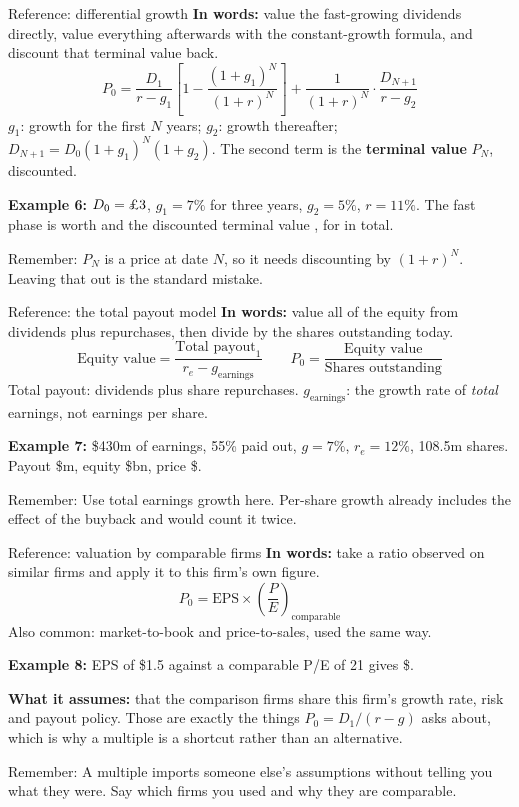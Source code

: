 \documentclass[10pt,aspectratio=169]{beamer}
\newcommand{\remember}[1]{\par\smallskip\alert{Remember:} #1}
\renewcommand{\pounds}{\ifmmode\text{\textsterling}\else\textsterling\fi}
\begin{document}
\begin{frame}[label=differential]{Reference: differential growth}
\textbf{In words:} value the fast-growing dividends directly, value everything afterwards with the constant-growth formula, and discount that terminal value back.
\[
P_0=\frac{D_1}{r-g_1}\left[1-\frac{(1+g_1)^N}{(1+r)^N}\right]+\frac{1}{(1+r)^N}\cdot\frac{D_{N+1}}{r-g_2}
\]
$g_1$: growth for the first $N$ years; $g_2$: growth thereafter; $D_{N+1}=D_0(1+g_1)^N(1+g_2)$. The second term is the \textbf{terminal value} $P_N$, discounted.
\par\smallskip
\textbf{Example 6:} $D_0=\pounds3$, $g_1=7\%$ for three years, $g_2=5\%$, $r=11\%$. The fast phase is worth \pounds\LDiffGrowthStage{} and the discounted terminal value \pounds\LDiffTerminal, for \pounds\LDiffTotal{} in total.
\remember{$P_N$ is a price at date $N$, so it needs discounting by $(1+r)^N$. Leaving that out is the standard mistake.}
\end{frame}

\begin{frame}[label=payout]{Reference: the total payout model}
\textbf{In words:} value all of the equity from dividends plus repurchases, then divide by the shares outstanding today.
\[
\text{Equity value}=\frac{\text{Total payout}_1}{r_e-g_{\text{earnings}}}
\qquad
P_0=\frac{\text{Equity value}}{\text{Shares outstanding}}
\]
Total payout: dividends plus share repurchases. $g_{\text{earnings}}$: the growth rate of \emph{total} earnings, not earnings per share.
\par\smallskip
\textbf{Example 7:} \$430m of earnings, 55\% paid out, $g=7\%$, $r_e=12\%$, 108.5m shares. Payout \$\LPayoutTotal m, equity \$\LPayoutValue bn, price \$\LPayoutPrice.
\remember{Use total earnings growth here. Per-share growth already includes the effect of the buyback and would count it twice.}
\end{frame}

\begin{frame}[label=multiples]{Reference: valuation by comparable firms}
\textbf{In words:} take a ratio observed on similar firms and apply it to this firm's own figure.
\[
P_0=\text{EPS}\times\left(\frac{P}{E}\right)_{\text{comparable}}
\]
Also common: market-to-book and price-to-sales, used the same way.
\par\smallskip
\textbf{Example 8:} EPS of \$1.5 against a comparable P/E of 21 gives \$\LMultiplePrice.
\par\smallskip
\textbf{What it assumes:} that the comparison firms share this firm's growth rate, risk and payout policy. Those are exactly the things $P_0=D_1/(r-g)$ asks about, which is why a multiple is a shortcut rather than an alternative.
\remember{A multiple imports someone else's assumptions without telling you what they were. Say which firms you used and why they are comparable.}
\end{frame}
\end{document}
